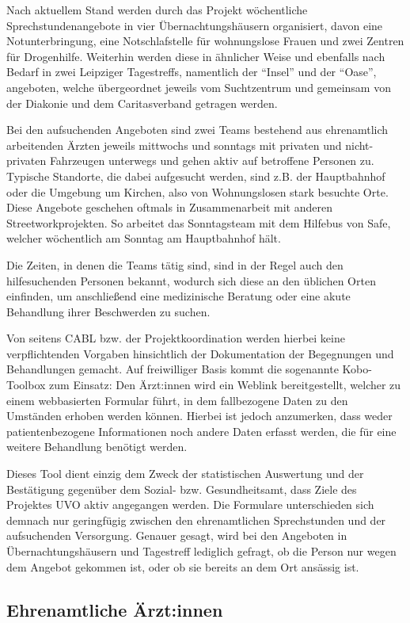 Nach aktuellem Stand werden durch das Projekt wöchentliche Sprechstundenangebote in vier Übernachtungshäusern organisiert, davon eine Notunterbringung, eine Notschlafstelle für wohnungslose Frauen und zwei Zentren für Drogenhilfe. Weiterhin werden diese in ähnlicher Weise und ebenfalls nach Bedarf in zwei Leipziger Tagestreffs, namentlich der \enquote{Insel} und der \enquote{Oase}, angeboten, welche übergeordnet jeweils vom Suchtzentrum und gemeinsam von der Diakonie und dem Caritasverband getragen werden.

Bei den aufsuchenden Angeboten sind zwei Teams bestehend aus ehrenamtlich arbeitenden Ärzten jeweils mittwochs und sonntags mit privaten und nicht-privaten Fahrzeugen unterwegs und gehen aktiv auf betroffene Personen zu. Typische Standorte, die dabei aufgesucht werden, sind z.B. der Hauptbahnhof oder die Umgebung um Kirchen, also von Wohnungslosen stark besuchte Orte. Diese Angebote geschehen oftmals in Zusammenarbeit mit anderen Streetworkprojekten. So arbeitet das Sonntagsteam mit dem Hilfebus von \ac{Safe}, welcher wöchentlich am Sonntag am Hauptbahnhof hält.

Die Zeiten, in denen die Teams tätig sind, sind in der Regel auch den hilfesuchenden Personen bekannt, wodurch sich diese an den üblichen Orten einfinden, um anschließend eine medizinische Beratung oder eine akute Behandlung ihrer Beschwerden zu suchen.

Von seitens CABL bzw. der Projektkoordination werden hierbei keine verpflichtenden Vorgaben hinsichtlich der Dokumentation der Begegnungen und Behandlungen gemacht. Auf freiwilliger Basis kommt die sogenannte Kobo-Toolbox zum Einsatz: Den Ärzt:innen wird ein Weblink bereitgestellt, welcher zu einem webbasierten Formular führt, in dem fallbezogene Daten zu den Umständen erhoben werden können. Hierbei ist jedoch anzumerken, dass weder patientenbezogene Informationen noch andere Daten erfasst werden, die für eine weitere Behandlung benötigt werden.

Dieses Tool dient einzig dem Zweck der statistischen Auswertung und der Bestätigung gegenüber dem Sozial- bzw. Gesundheitsamt, dass Ziele des Projektes UVO aktiv angegangen werden. Die Formulare unterschieden sich demnach nur geringfügig zwischen den ehrenamtlichen Sprechstunden und der aufsuchenden Versorgung. Genauer gesagt, wird bei den Angeboten in Übernachtungshäusern und Tagestreff lediglich gefragt, ob die Person nur wegen dem Angebot gekommen ist, oder ob sie bereits an dem Ort ansässig ist.

\subsection{Ehrenamtliche Ärzt:innen}

